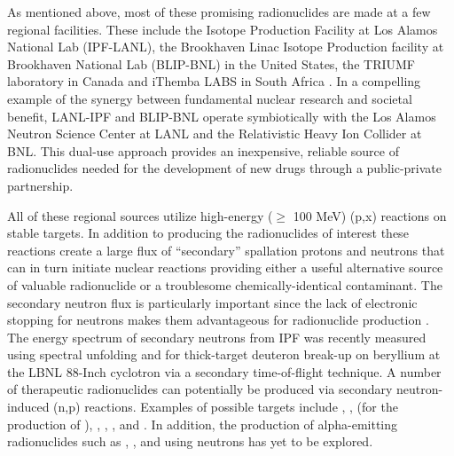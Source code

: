 \documentclass[letterpaper]{ar-1col}
\begin{document}
As mentioned above, most of these promising radionuclides are made at a few regional facilities.  These include the Isotope Production Facility at Los Alamos National Lab (IPF-LANL), the Brookhaven Linac Isotope Production facility at Brookhaven National Lab (BLIP-BNL) in the United States, the TRIUMF laboratory in Canada and iThemba LABS in South Africa \cite{Iae675,NSACIsotopesSubcommittee2015}.  In a compelling example of the synergy between fundamental nuclear research and societal benefit, LANL-IPF and BLIP-BNL operate symbiotically with the Los Alamos Neutron Science Center at LANL and the Relativistic Heavy Ion Collider at BNL.  This dual-use approach provides an inexpensive, reliable source of radionuclides needed for the development of new drugs through a public-private partnership. 

All of these regional sources utilize high-energy ($\geq$ 100 MeV) (p,x) reactions on stable targets.  In addition to producing the radionuclides of interest these reactions create a large flux of \enquote{secondary} spallation protons and neutrons that can in turn initiate nuclear reactions providing either a useful alternative source of valuable radionuclide or a troublesome chemically-identical contaminant.  The secondary neutron flux is particularly important since the lack of electronic stopping for neutrons makes them advantageous for radionuclide production \cite{Voyles2017}.  The energy spectrum of secondary neutrons from IPF was recently measured using spectral unfolding \cite{Mos16} and for thick-target deuteron break-up on beryllium at the LBNL 88-Inch cyclotron \cite{Harrig2018} via a secondary time-of-flight technique. A number of therapeutic radionuclides can potentially be produced via secondary neutron-induced (n,p) reactions. Examples of possible targets include , ,  (for the production of ), , , , and .  In addition, the production of alpha-emitting radionuclides such as , , and  using neutrons has yet to be explored.
\end{document}

